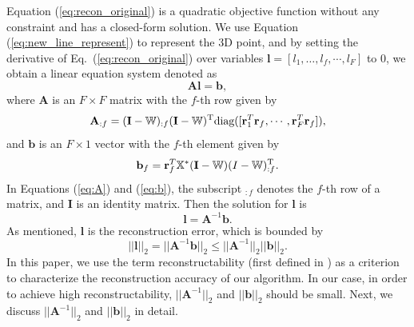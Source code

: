 Equation (\ref{eq:recon_original}) is a quadratic objective function without any constraint and has a closed-form solution. We use Equation (\ref{eq:new_line_represent}) to represent the 3D point, and by setting the derivative of Eq.~(\ref{eq:recon_original}) over variables $\mathbf{l} = [l_1,\dots,l_f,\cdots,l_F ]$ to 0, we obtain a linear equation system denoted as
\begin{equation}
\mathbf{A}\mathbf{l} = \mathbf{b},	\label{eq:alb}
\end{equation}
where $\mathbf{A}$ is an $F \times F$ matrix with the $f$-th row given by
\begin{equation}
\mathbf{A}_{:f} = (\mathbf{I}-\mathbb W)_{:f}(\mathbf{I}-\mathbb W)^\text{T} \text{diag}([\mathbf{r}^T_1 \mathbf{r}_f, \cdots, \mathbf{r}_F^T \mathbf{r}_f] ),
\label{eq:A}
\end{equation}
and $\mathbf{b}$ is an $F \times 1$ vector with the $f$-th element given by
\begin{equation}
\mathbf{b}_{f} = \mathbf{r}_f^T \mathbb X^* (\mathbf{I}-\mathbb W) (I-\mathbb W)_{:f}^{\text{T}}.
\label{eq:b}
\end{equation}
In Equations (\ref{eq:A}) and (\ref{eq:b}), the subscript $_{:f}$ denotes the $f$-th row of a matrix, and $\mathbf{I}$ is an identity matrix. Then the solution for $\mathbf{l}$ is
\begin{equation}
\mathbf{l} = \mathbf{A}^{-1}\mathbf{b}. 
\label{eq:a_minus_1_b}
\end{equation}
As mentioned, $\mathbf{l}$ is the reconstruction error, 
which is bounded by 
\begin{equation}
||\mathbf{l}||_2= ||\mathbf{A}^{-1} \mathbf{b}||_2 \leq ||\mathbf{A}^{-1}||_2 ||\mathbf{b}||_2.
\end{equation}
In this paper, we use the term reconstructability (first defined in \cite{Park_ECCV2010}) as a criterion to characterize the reconstruction accuracy of our algorithm. 
In our case, in order to achieve high reconstructability, $||\mathbf{A}^{-1}||_2$ and $||\mathbf{b}||_2$ should be small. Next, we discuss $||\mathbf{A}^{-1}||_2$ and $||\mathbf{b}||_2$ in detail.


